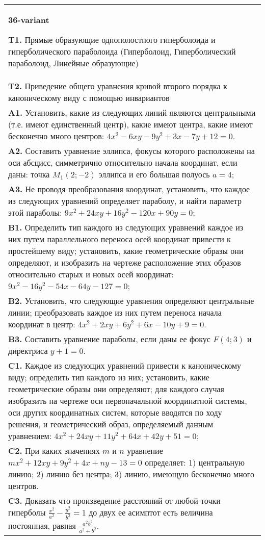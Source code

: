 \documentclass{article}
\begin{document}
\begin{tabular}{m{17cm}}
\textbf{36-variant}
\newline

\textbf{T1.} Прямые образующие однополостного гиперболоида и гиперболического параболоида (Гиперболоид, Гиперболический параболоид, Линейные образующие) \\
\textbf{T2.} Приведение общего уравнения кривой второго порядка к каноническому виду с помощью инвариантов \\
\textbf{A1.} Установить, какие из следующих линий являются центральными (т.е. имеют единственный центр), какие имеют центра, какие имеют бесконечно много центров: $4 x^2-6 x y-9 y^2+3 x-7 y+12=0$. \\
\textbf{A2.} Составить уравнение эллипса, фокусы которого расположены на оси абсцисс, симметрично относительно начала координат, если даны: точка $M_1(2 ;-2)$ эллипса и его большая полуось $a=4$; \\
\textbf{A3.} Не проводя преобразования координат, установить, что каждое из следующих уравнений определяет параболу, и найти параметр этой параболы: $9 x^2+24 x y+16 y^2-120 x+90 y=0$; \\
\textbf{B1.} Определить тип каждого из следующих уравнений каждое из них путем параллельного переноса осей координат привести к простейшему виду; установить, какие геометрические образы они определяют, и изобразить на чертеже расположение этих образов относительно старых и новых осей координат: $9 x^2-16 y^2-54 x-64 y-127=0$; \\
\textbf{B2.} Установить, что следующие уравнения определяют центральные линии; преобразовать каждое из них путем переноса начала координат в центр: $4 x^2+2 x y+6 y^2+6 x-10 y+9=0$. \\
\textbf{B3.} Составить уравнение параболы, если даны ее фокус $F(4 ; 3)$ и директриса $y+1=0$. \\
\textbf{C1.} Каждое из следующих уравнений привести к каноническому виду; определить тип каждого из них; установить, какие геометрические образы они определяют; для каждого случая изобразить на чертеже оси первоначальной координатной системы, оси других координатных систем, которые вводятся по ходу решения, и геометрический образ, определяемый данным уравнением: $4 x^2+24 x y+11 y^2+64 x+42 y+51=0$; \\
\textbf{C2.} При каких значениях $m$ и $n$ уравнение $m x^2+12 x y+9 y^2+4 x+n y-13=0$ определяет: 1) центральную линию; 2) линию без центра; 3) линию, имеющую бесконечно много центров. \\
\textbf{C3.} Доказать что произведение расстояний от любой точки гиперболы $\frac{x^2}{a^2}-\frac{y^2}{b^2}=1$ до двух ее асимптот есть величина постоянная, равная $\frac{a^2 b^2}{a^2+b^2}$. \\

\end{tabular}
\vspace{1cm}
\end{document}
